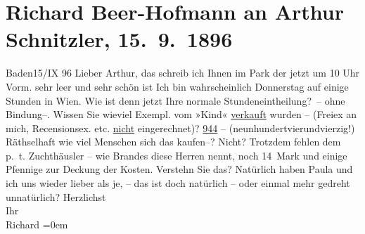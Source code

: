 

         
         \renewcommand{\erwaehntePersonen}{Personen: Richard Beer-Hofmann, Paula Beer-Hofmann, Georg Brandes}
         \renewcommand{\erwaehnteOrte}{Orte: Baden bei Wien, Wien}
         \renewcommand{\erwaehnteWerke}{Werke: Das Kind}
               \section[Richard Beer-Hofmann an Arthur Schnitzler, 15. 9. 1896]{ Richard Beer-Hofmann an Arthur Schnitzler, 15. 9. 1896}\nopagebreak{}\rehead{ }\begin{ledgroupsized}[t]{13cm}\normalsize\beginnumbering{} \toendnotes[C]{\smallbreak\pagebreak[2]} 
\pstart
           {\pb}Baden15/IX 96\pend
           \pstart
           Lieber Arthur, das schreib ich Ihnen im Park der jetzt um 10
                  Uhr Vorm. sehr leer und sehr schön ist\pend
           \pstart
           Ich bin wahrscheinlich Donnerstag auf einige Stunden in Wien. Wie ist denn jetzt Ihre normale Stundeneintheilung? – ohne
                  {\pb}Bindung–. Wissen Sie wieviel
               Exempl. vom »Kind« \uline{verkauft} wurden – (Freiex an mich, Recensionsex. etc. \uline{nicht} eingerechnet)?\pend
           \pstart
           \uline{944} – (neunhundertvierundvierzig!) Räthselhaft wie
               viel Menschen sich das kaufen–? Nicht? Trotzdem {\pb}fehlen dem p. t. Zuchthäusler – wie
                  Brandes diese Herren nennt, noch 14 Mark
               und einige Pfennige zur Deckung der Kosten. Verstehn Sie das?\pend
           \pstart
           Natürlich haben Paula und ich uns wieder
               lieber als {\pb}je, – das ist doch
               natürlich – oder  einmal mehr gedreht
               unnatürlich?\pend
           \pstart
           Herzlichst{\\[\baselineskip]}Ihr{\\[\baselineskip]}\spacefill\mbox{Richard}\pend
           \leftskip=0em{}
         

\end{ledgroupsized}
